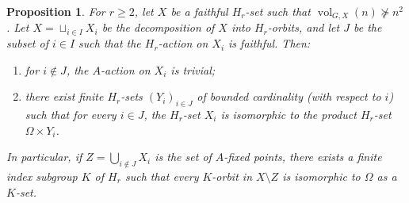 \documentclass[11pt]{amsart}
\newcommand{\vol}{\ensuremath{\operatorname{vol}}}%
\theoremstyle{definition}
\theoremstyle{plain}
\newtheorem{prop}[defin]{Proposition}
\theoremstyle{remark}
\begin{document}
\begin{prop} \label{p-Houghton}
For $r \ge 2$, let $X$ be a faithful $H_r$-set such that $\vol_{G, X}(n) \not \succeq n^2$. Let $X=\sqcup_{i \in I} X_i$ be the decomposition of $X$ into  $H_r$-orbits, and let $J$ be the subset of $i\in I$ such that the $H_r$-action on $X_i$ is  faithful.
Then:
\begin{enumerate}
\item \label{i-A-trivial} for $i\notin J$, the $A$-action on $X_i$ is trivial;
\item \label{i-A-non-trivial} there exist finite  $H_r$-sets $(Y_i)_{i\in J}$ of bounded cardinality (with respect to $i$) such that for every $i\in J$, the $H_r$-set $X_i$ is isomorphic to the product $H_r$-set $\Omega\times Y_i$.


\end{enumerate}
In particular, if $Z=\bigcup_{i\notin J} X_i$ is the set of $A$-fixed points, there exists a finite index subgroup $K$ of $H_r$ such that every $K$-orbit in $X\setminus Z$ is isomorphic to $\Omega$ as a $K$-set.
\end{prop}
\end{document}
